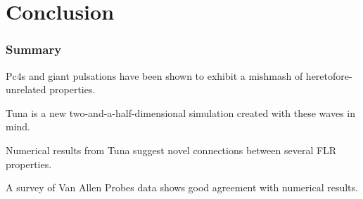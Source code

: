 \documentclass{beamer}
\begin{document}

\section{Conclusion}


\begin{frame}
\frametitle{Summary}

\begin{wideitemize}
\item Pc4s and giant pulsations have been shown to exhibit a mishmash of heretofore-unrelated properties. 
\item Tuna is a new two-and-a-half-dimensional simulation created with these waves in mind. 
\item Numerical results from Tuna suggest novel connections between several FLR properties. 
\item A survey of Van Allen Probes data shows good agreement with numerical results. 
\end{wideitemize}

\end{frame}

\end{document}

